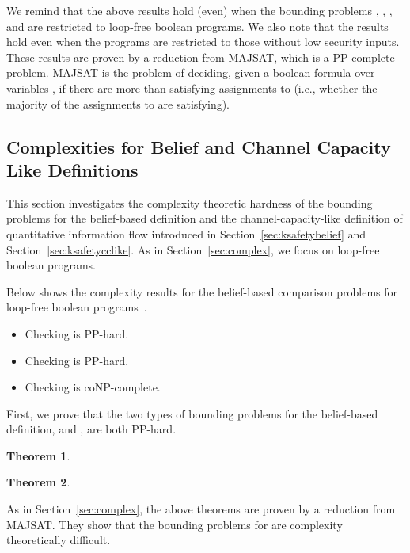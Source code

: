 \documentclass{llncs}
\newtheorem{theorem}{Theorem}[section]
\begin{document}
We remind that the above results hold (even) when the bounding
problems , , , and
 are restricted to loop-free boolean programs.  We also
note that the results hold even when the programs are restricted to
those without low security inputs.  These results are proven by a
reduction from MAJSAT, which is a PP-complete problem.  MAJSAT is the
problem of deciding, given a boolean formula  over variables
, if there are more than  satisfying
assignments to  (i.e., whether the majority of the assignments
to  are satisfying).

\subsection{Complexities for Belief and Channel Capacity Like Definitions}

\label{sec:complexbeliefcclike}

This section investigates the complexity theoretic hardness of the
bounding problems for the belief-based definition and the
channel-capacity-like definition of quantitative information flow
introduced in Section~\ref{sec:ksafetybelief} and
Section~\ref{sec:ksafetycclike}.  As in Section~\ref{sec:complex}, we
focus on loop-free boolean programs.

Below shows the complexity results for the belief-based comparison
problems for loop-free boolean
programs~\cite{yasuoka:toplas2010submit}.
\begin{itemize}
\item[(1)] Checking  is PP-hard.
\item[(2)] Checking  is PP-hard.
\item[(3)] Checking  is coNP-complete.
\end{itemize}

First, we prove that the two types of bounding problems for the
belief-based definition,  and , are both
PP-hard.
\begin{theorem}
\label{thm:ppbe1}

\end{theorem}
\begin{theorem}
\label{thm:ppbe2}

\end{theorem}
As in Section~\ref{sec:complex}, the above theorems are proven by
a reduction from MAJSAT.  They show that the bounding problems for
 are complexity theoretically difficult.
\end{document}
